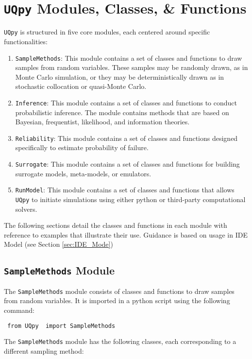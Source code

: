 \documentclass[./UsersGuide.tex]{subfiles}
\begin{document}
\section{\texttt{UQpy} Modules, Classes, \& Functions}

\texttt{UQpy} is structured in five core modules, each centered around specific functionalities:
\begin{enumerate}
\item \texttt{SampleMethods}: This module contains a set of classes and functions to draw samples from random variables. These samples may be randomly drawn, as in Monte Carlo simulation, or they may be deterministically drawn as in stochastic collocation or quasi-Monte Carlo.
\item \texttt{Inference}: This module contains a set of classes and functions to conduct probabilistic inference. The module contains methods that are based on Bayesian, frequentist, likelihood, and information theories. 
\item \texttt{Reliability}: This module contains a set of classes and functions designed specifically to estimate probability of failure.
\item \texttt{Surrogate}: This module contains a set of classes and functions for building surrogate models, meta-models, or emulators.
\item \texttt{RunModel}: This module contains a set of classes and functions that allows \texttt{UQpy} to initiate simulations using either python or third-party computational solvers.
\end{enumerate}
The following sections detail the classes and functions in each module with reference to examples that illustrate their use. Guidance is based on usage in IDE Model (see Section \ref{sec:IDE_Mode})

\subsection{\texttt{SampleMethods} Module}

The \texttt{SampleMethods} module consists of classes and functions to draw samples from random variables. It is imported in a python script using the following command:

\vspace{4mm}
\texttt{{\color{blue} from} \texttt{UQpy} {\color{blue} import} SampleMethods }
\vspace{4mm}

\noindent
The \texttt{SampleMethods} module has the following classes, each corresponding to a different sampling method:
\end{document}
